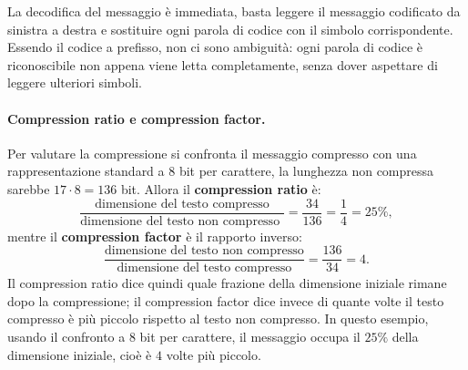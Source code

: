 \documentclass{article}
\theoremstyle{definition}
\numberwithin{equation}{section}
\begin{document}
La decodifica del messaggio è immediata, basta leggere il messaggio codificato da sinistra a destra e sostituire ogni parola di codice con il simbolo corrispondente. Essendo il codice a prefisso, non ci sono ambiguità: ogni parola di codice è riconoscibile non appena viene letta completamente, senza dover aspettare di leggere ulteriori simboli.

\paragraph{Compression ratio e compression factor.}
Per valutare la compressione si confronta il messaggio compresso con una rappresentazione standard a $8$ bit per carattere, la lunghezza non compressa sarebbe $17\cdot 8 = 136$ bit. Allora il \textbf{compression ratio} è:
\[
    \frac{\text{dimensione del testo compresso}}{\text{dimensione del testo non compresso }}
    =
    \frac{34}{136}
    =
    \frac{1}{4}
    =
    25\%,
\]
mentre il \textbf{compression factor} è il rapporto inverso:
\[
    \frac{\text{dimensione del testo non compresso}}{\text{dimensione del testo compresso}}
    =
    \frac{136}{34}
    =
    4.
\]
Il compression ratio dice quindi quale frazione della dimensione iniziale rimane dopo la compressione; il compression factor dice invece di quante volte il testo compresso è più piccolo rispetto al testo non compresso. In questo esempio, usando il confronto a $8$ bit per carattere, il messaggio occupa il $25\%$ della dimensione iniziale, cioè è $4$ volte più piccolo.
\end{document}
